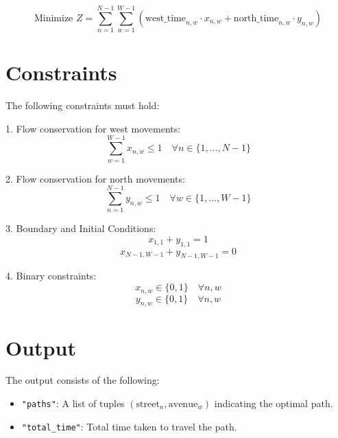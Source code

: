 \documentclass{article}
\begin{document}
\[
\text{Minimize } Z = \sum_{n=1}^{N-1} \sum_{w=1}^{W-1} \left( \text{west\_time}_{n,w} \cdot x_{n,w} + \text{north\_time}_{n,w} \cdot y_{n,w} \right)
\]

\section{Constraints}

The following constraints must hold:

1. Flow conservation for west movements:
\[
\sum_{w=1}^{W-1} x_{n,w} \leq 1 \quad \forall n \in \{1, \ldots, N-1\}
\]

2. Flow conservation for north movements:
\[
\sum_{n=1}^{N-1} y_{n,w} \leq 1 \quad \forall w \in \{1, \ldots, W-1\}
\]

3. Boundary and Initial Conditions:
\[
x_{1,1} + y_{1,1} = 1
\]
\[
x_{N-1,W-1} + y_{N-1,W-1} = 0
\]

4. Binary constraints:
\[
x_{n,w} \in \{0, 1\} \quad \forall n,w
\]
\[
y_{n,w} \in \{0, 1\} \quad \forall n,w
\]

\section{Output}

The output consists of the following:

\begin{itemize}
    \item \texttt{"paths"}: A list of tuples \((\text{street}_{n}, \text{avenue}_{w})\) indicating the optimal path.
    \item \texttt{"total\_time"}: Total time taken to travel the path.
\end{itemize}
\end{document}
